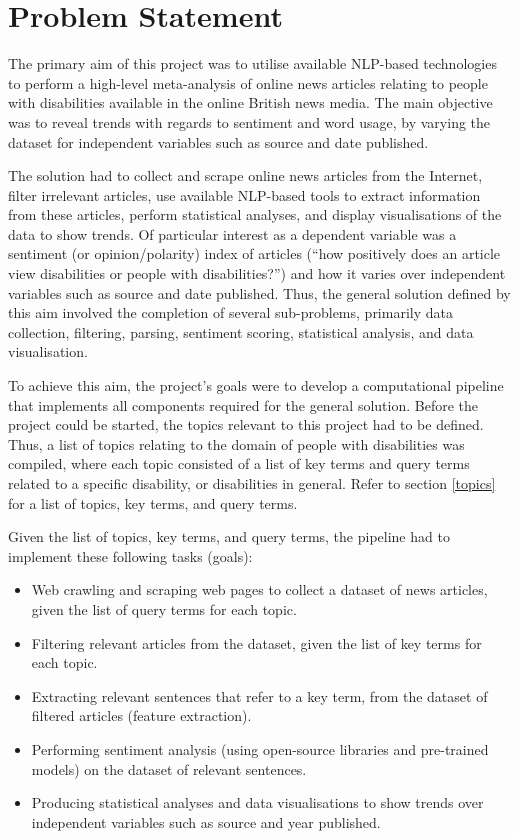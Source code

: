 \documentclass{report}
\begin{document}
\section{Problem Statement} \label{Problem Statement}

The primary aim of this project was to utilise available NLP-based technologies to perform a high-level meta-analysis of online news articles relating to people with disabilities available in the online British news media. 
The main objective was to reveal trends with regards to sentiment and word usage, by varying the dataset for independent variables such as source and date published.

The solution had to collect and scrape online news articles from the Internet, filter irrelevant articles, use available NLP-based tools to extract information from these articles, perform statistical analyses, and display visualisations of the data to show trends.
Of particular interest as a dependent variable was a sentiment (or opinion/polarity) index of articles (``how positively does an article view disabilities or people with disabilities?'') and how it varies over independent variables such as source and date published.
Thus, the general solution defined by this aim involved the completion of several sub-problems, primarily data collection, filtering, parsing, sentiment scoring, statistical analysis, and data visualisation.

To achieve this aim, the project's goals were to develop a computational pipeline that implements all components required for the general solution.
Before the project could be started, the topics relevant to this project had to be defined.
Thus, a list of topics relating to the domain of people with disabilities was compiled, where each topic consisted of a list of key terms and query terms related to a specific disability, or disabilities in general.
Refer to section \ref{topics} for a list of topics, key terms, and query terms.

Given the list of topics, key terms, and query terms, the pipeline had to implement these following tasks (goals):
\begin{itemize}
	\item Web crawling and scraping web pages to collect a dataset of news articles, given the list of query terms for each topic.
	\item Filtering relevant articles from the dataset, given the list of key terms for each topic.
	\item Extracting relevant sentences that refer to a key term, from the dataset of filtered articles (feature extraction).
	\item Performing sentiment analysis (using open-source libraries and pre-trained models) on the dataset of relevant sentences.
	\item Producing statistical analyses and data visualisations to show trends over independent variables such as source and year published.
\end{itemize}
\end{document}
